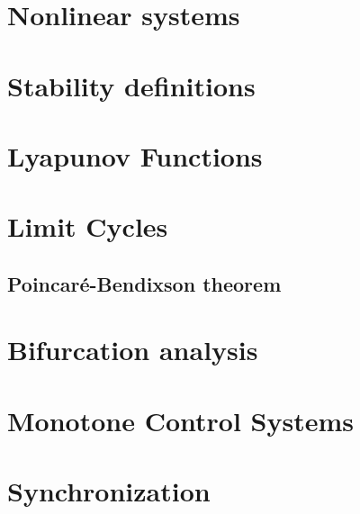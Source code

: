 \section{Nonlinear systems}
\section{Stability definitions}
\section{Lyapunov Functions}
\section{Limit Cycles}
\subsection{Poincaré-Bendixson theorem}
\section{Bifurcation analysis}


\section{Monotone Control Systems}

\section{Synchronization}
